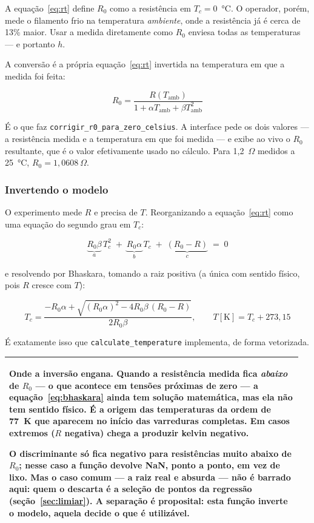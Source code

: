 \documentclass[11pt,a4paper]{article}
\newenvironment{nota}
  {\par\medskip\noindent\begin{tabular}{|p{0.96\linewidth}|}\hline\rule{0pt}{3ex}}
  {\\[1ex]\hline\end{tabular}\par\medskip}
\begin{document}
A equação~\eqref{eq:rt} define $R_0$ como a resistência em $T_c = 0$~°C. O
operador, porém, mede o filamento frio na temperatura \emph{ambiente}, onde a
resistência já é cerca de 13\% maior. Usar a medida diretamente como $R_0$
enviesa todas as temperaturas --- e portanto $h$.

A conversão é a própria equação~\eqref{eq:rt} invertida na temperatura em que
a medida foi feita:

\begin{equation}
R_0 = \frac{R(T_{\text{amb}})}{1 + \alpha T_{\text{amb}} + \beta T_{\text{amb}}^2}
\label{eq:r0}
\end{equation}

É o que faz \texttt{corrigir\_r0\_para\_zero\_celsius}. A interface pede os
dois valores --- a resistência medida e a temperatura em que foi medida --- e
exibe ao vivo o $R_0$ resultante, que é o valor efetivamente usado no cálculo.
Para 1{,}2~$\Omega$ medidos a 25~°C, $R_0 = 1{,}0608~\Omega$.

\subsubsection*{Invertendo o modelo}

O experimento mede $R$ e precisa de $T$. Reorganizando a
equação~\eqref{eq:rt} como uma equação do segundo grau em $T_c$:

\begin{equation}
\underbrace{R_0\beta}_{a}\,T_c^2 \;+\; \underbrace{R_0\alpha}_{b}\,T_c
\;+\; \underbrace{(R_0 - R)}_{c} \;=\; 0
\end{equation}

e resolvendo por Bhaskara, tomando a raiz positiva (a única com sentido
físico, pois $R$ cresce com $T$):

\begin{equation}
T_c = \frac{-R_0\alpha + \sqrt{(R_0\alpha)^2 - 4 R_0\beta\,(R_0 - R)}}{2 R_0 \beta},
\qquad
T[\mathrm{K}] = T_c + 273{,}15
\label{eq:bhaskara}
\end{equation}

É exatamente isso que \texttt{calculate\_temperature} implementa, de forma
vetorizada.

\begin{nota}
\textbf{Onde a inversão engana.} Quando a resistência medida fica
\emph{abaixo} de $R_0$ --- o que acontece em tensões próximas de zero --- a
equação~\eqref{eq:bhaskara} ainda tem solução matemática, mas ela não tem
sentido físico. É a origem das temperaturas da ordem de 77~K que aparecem no
início das varreduras completas. Em casos extremos ($R$ negativa) chega a
produzir kelvin negativo.

O discriminante só fica negativo para resistências muito abaixo de $R_0$;
nesse caso a função devolve NaN, ponto a ponto, em vez de lixo. Mas o caso
comum --- a raiz real e absurda --- não é barrado aqui: quem o descarta é a
seleção de pontos da regressão (seção~\ref{sec:limiar}). A separação é
proposital: esta função inverte o modelo, aquela decide o que é utilizável.
\end{nota}
\end{document}

